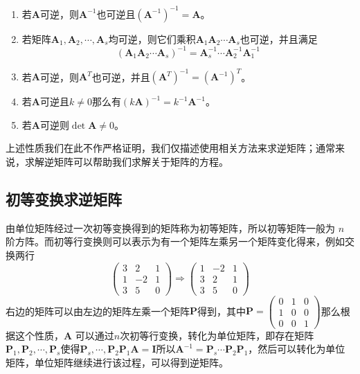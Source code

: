 \begin{corollary}
	\begin{enumerate}
		\item 若$\mathbf{A}$可逆，则$\mathbf{A}^{-1}$也可逆且$\left( \mathbf{A}^{-1} \right)^{-1}=\mathbf{A}$。
		\item 若矩阵$\mathbf{A}_1,\mathbf{A}_2,\cdots,\mathbf{A}_s$均可逆，则它们乘积$\mathbf{A}_1\mathbf{A}_2\cdots\mathbf{A}_s$也可逆，并且满足$$\left( \mathbf{A}_1\mathbf{A}_2\cdots\mathbf{A}_s \right)^{-1}=\mathbf{A}_s^{-1}\cdots\mathbf{A}_2^{-1}\mathbf{A}_1^{-1}$$
		\item 若$\mathbf{A}$可逆，则$\mathbf{A}^T$也可逆，并且$\left( \mathbf{A}^T \right)^{-1}=\left( \mathbf{A}^{-1} \right)^T$。
		\item 若$\mathbf{A}$可逆且$k\neq 0$那么有$(k\mathbf{A})^{-1}=k^{-1}\mathbf{A}^{-1}$。
		\item 若$\mathbf{A}$可逆则$\det \mathbf{A}\neq 0$。
	\end{enumerate}
\end{corollary}

上述性质我们在此不作严格证明，我们仅描述使用相关方法来求逆矩阵；通常来说，求解逆矩阵可以帮助我们求解关于矩阵的方程。

\subsection{初等变换求逆矩阵}

由单位矩阵经过一次初等变换得到的矩阵称为初等矩阵，所以初等矩阵一般为 $n$ 阶方阵。而初等行变换则可以表示为有一个矩阵左乘另一个矩阵变化得来，例如交换两行$$\begin{pmatrix}
	3 & 2 & 1\\
	1 & -2 & 1\\
	3 & 5 & 0
\end{pmatrix}\Longrightarrow  \begin{pmatrix}
	1 & -2 & 1\\
	3 & 2 & 1\\
	3 & 5 & 0
\end{pmatrix}$$右边的矩阵可以由左边的矩阵左乘一个矩阵$\mathbf{P}$得到，其中$\mathbf{P}=\begin{pmatrix}
	0 & 1 & 0\\
	1 & 0 & 0\\
	0 & 0 & 1
\end{pmatrix}$那么根据这个性质，$\mathbf{A}$ 可以通过$n$次初等行变换，转化为单位矩阵，即存在矩阵$\mathbf{P}_1,\mathbf{P}_2,\cdots,\mathbf{P}_s$使得$\mathbf{P}_s,\cdots,\mathbf{P}_2\mathbf{P}_1\mathbf{A}=\mathbf{I}$所以$\mathbf{A}^{-1}=\mathbf{P}_s\cdots\mathbf{P}_2\mathbf{P}_1$，然后可以转化为单位矩阵，单位矩阵继续进行该过程，可以得到逆矩阵。

